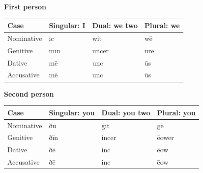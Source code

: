 \par\addvspace{3pt}
\textbf{First person}\par\nobreak
\par\begingroup
\fontsize{10.5}{13.2}\selectfont
\setlength{\LTleft}{0pt}\setlength{\LTright}{\fill}
\noindent
\begin{tabular}{@{}>{\raggedright\arraybackslash}p{22.0mm}>{\raggedright\arraybackslash}p{31.188mm}>{\raggedright\arraybackslash}p{31.188mm}>{\raggedright\arraybackslash}p{31.188mm}@{}}
\toprule
\textbf{Case} & \textbf{Singular: I} & \textbf{Dual: we two} & \textbf{Plural: we} \\
\midrule
Nominative & ic & wit & wē \\
Genitive & mīn & uncer & ūre \\
Dative & mē & unc & ūs \\
Accusative & mē & unc & ūs \\
\bottomrule
\end{tabular}
\par\endgroup
\par\addvspace{5pt}
\par\addvspace{3pt}
\textbf{Second person}\par\nobreak
\par\begingroup
\fontsize{10.5}{13.2}\selectfont
\setlength{\LTleft}{0pt}\setlength{\LTright}{\fill}
\noindent
\begin{tabular}{@{}>{\raggedright\arraybackslash}p{22.0mm}>{\raggedright\arraybackslash}p{31.188mm}>{\raggedright\arraybackslash}p{31.188mm}>{\raggedright\arraybackslash}p{31.188mm}@{}}
\toprule
\textbf{Case} & \textbf{Singular: you} & \textbf{Dual: you two} & \textbf{Plural: you} \\
\midrule
Nominative & ðū & git & gē \\
Genitive & ðīn & incer & ēower \\
Dative & ðē & inc & ēow \\
Accusative & ðē & inc & ēow \\
\bottomrule
\end{tabular}
\par\endgroup
